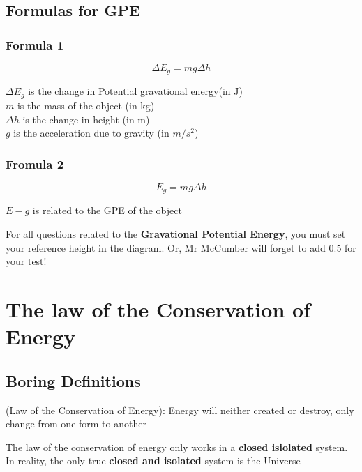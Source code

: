 \subsection{Formulas for GPE}
\subsubsection*{Formula 1}
\begin{equation}
    \Delta E_g = mg\Delta h
\end{equation}

\begin{center}
    $\Delta E_g$ is the change in Potential gravational energy(in J)\\
    $m$ is the mass of the object (in kg)\\
    $\Delta h$ is the change in height (in m)\\
    $g$ is the acceleration due to gravity (in $m/s^2$)
\end{center}

\subsubsection*{Fromula 2}
\begin{equation}
    E_g = mg\Delta h
\end{equation}
\begin{center}
    $E-g$ is related to the GPE of the object
\end{center}

\begin{remark}
    For all questions related to the \textbf{Gravational Potential Energy}, you must set your reference height in the diagram. Or, Mr McCumber will forget to add 0.5 for your test!
\end{remark}

\section{The law of the Conservation of Energy}
\subsection{Boring Definitions}
\begin{definition}
    (Law of the Conservation of Energy): Energy will neither created or destroy, only change from one form to another
\end{definition}

\begin{remark}
    The law of the conservation of energy only works in a \textbf{closed isiolated} system. In reality, the only true \textbf{closed and isolated} system is the Universe
\end{remark}

